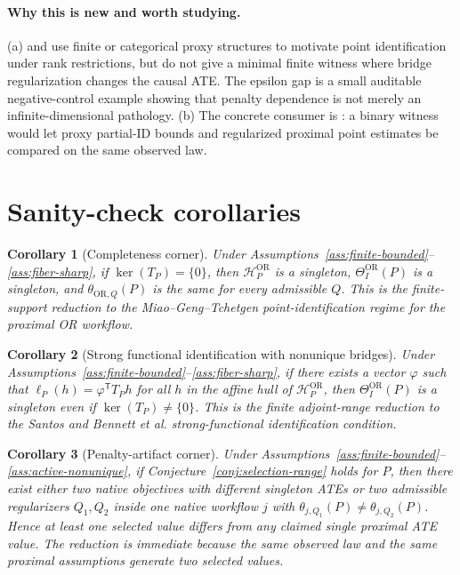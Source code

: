 \documentclass[11pt]{article}
\newcommand{\transpose}{\mathsf{T}}
\newcommand{\calH}{\mathcal{H}}
\theoremstyle{definition}
\theoremstyle{plain}
\newtheorem{corollary}{Corollary}
\theoremstyle{remark}
\begin{document}
\paragraph{Why this is new and worth studying.}
(a) \citet{MiaoGengTchetgen2018Biometrika} and
\citet{ShiMiaoNelsonTchetgen2020JRSSB} use finite or categorical proxy
structures to motivate point identification under rank restrictions, but do
not give a minimal finite witness where bridge regularization changes the
causal ATE.  The epsilon gap is a small auditable negative-control example
showing that penalty dependence is not merely an infinite-dimensional
pathology.  (b) The concrete consumer is
\citet{GhassamiShpitserTchetgen2023ProxyPI}: a binary witness would let
proxy partial-ID bounds and regularized proximal point estimates be compared
on the same observed law.

\section{Sanity-check corollaries}
\begin{corollary}[Completeness corner]\label{cor:completeness}
Under Assumptions~\ref{ass:finite-bounded}--\ref{ass:fiber-sharp}, if
\(\operatorname{ker}(T_P)=\{0\}\), then
\(\calH_P^{\mathrm{OR}}\) is a singleton,
\(\Theta_I^{\mathrm{OR}}(P)\) is a singleton, and
\(\theta_{\mathrm{OR},Q}(P)\) is the same for every admissible \(Q\).  This
is the finite-support reduction to the Miao--Geng--Tchetgen
point-identification regime for the proximal OR workflow.
\end{corollary}

\begin{corollary}[Strong functional identification with nonunique bridges]\label{cor:strong-functional}
Under Assumptions~\ref{ass:finite-bounded}--\ref{ass:fiber-sharp}, if there
exists a vector \(\varphi\) such that \(\ell_P(h)=\varphi^\transpose T_Ph\)
for all \(h\) in the affine hull of \(\calH_P^{\mathrm{OR}}\), then
\(\Theta_I^{\mathrm{OR}}(P)\) is a singleton even if
\(\operatorname{ker}(T_P)\neq\{0\}\).  This is the finite adjoint-range
reduction to the Santos and Bennett et al. strong-functional identification
condition.
\end{corollary}

\begin{corollary}[Penalty-artifact corner]\label{cor:artifact}
Under Assumptions~\ref{ass:finite-bounded}--\ref{ass:active-nonunique}, if
Conjecture~\ref{conj:selection-range} holds for \(P\), then there exist
either two native objectives with different singleton ATEs or two admissible
regularizers \(Q_1,Q_2\) inside one native workflow \(j\) with
\(\theta_{j,Q_1}(P)\neq\theta_{j,Q_2}(P)\).  Hence at least one selected
value differs from any claimed single proximal ATE value.  The reduction is
immediate because the same observed law and the same proximal assumptions
generate two selected values.
\end{corollary}
\end{document}
